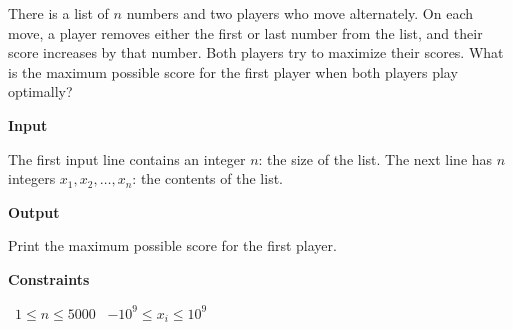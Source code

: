 There is a list of $n$ numbers and two players who move alternately. On each move, a player removes either the first or last number from the list, and their score increases by that number. Both players try to maximize their scores.
What is the maximum possible score for the first player when both players play optimally?

\vspace{0.3cm}\noindent\textbf{Input}

The first input line contains an integer $n$: the size of the list.
The next line has $n$ integers $x_1,x_2,\ldots,x_n$: the contents of the list.

\vspace{0.3cm}\noindent\textbf{Output}

Print the maximum possible score for the first player.

\vspace{0.3cm}\noindent\textbf{Constraints}

\textbullet\ $1 \le n \le 5000$
\textbullet\ $-10^9 \le x_i \le 10^9$